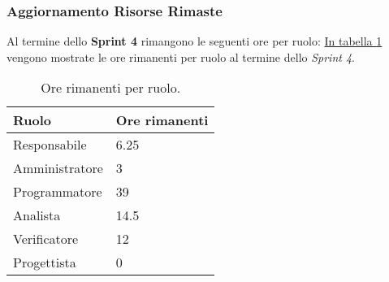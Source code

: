 \subsubsection{Aggiornamento Risorse Rimaste}
\label{sec:AggiornamentoRisorse_Sprint4}
Al termine dello \textbf{Sprint 4} rimangono le seguenti ore per ruolo: \hyperref[tab:sprint4_ore_rimanenti]{In tabella \ref{tab:sprint4_ore_rimanenti}} vengono mostrate le ore rimanenti per ruolo al termine dello \textit{Sprint 4}.

\begin{table}[H]
    \centering
    \begin{tabular}{| l | l |}
    \hline
    \textbf{Ruolo} & 
    \textbf{Ore rimanenti}\\
    \hline
        Responsabile & 6.25 \\
    \hline
        Amministratore & 3 \\
    \hline
        Programmatore & 39\\
    \hline
        Analista & 14.5\\
    \hline
        Verificatore & 12\\
    \hline
        Progettista & 0\\
    \hline
    \end{tabular}
    \caption{Ore rimanenti per ruolo.}
    \label{tab:sprint4_ore_rimanenti} 
\end{table}